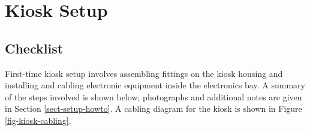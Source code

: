 
\chapter{Kiosk Setup}
\label{sect-setup}

\section{Checklist}
\label{sect-setup-checklist}

First-time kiosk setup involves assembling fittings on the kiosk housing 
and installing and cabling electronic equipment inside the electronics bay.
A summary of the steps involved is shown below; photographs and additional
notes are given in Section \ref{sect-setup-howto}.
A cabling diagram for the kiosk is shown in Figure \ref{fig-kiosk-cabling}.

